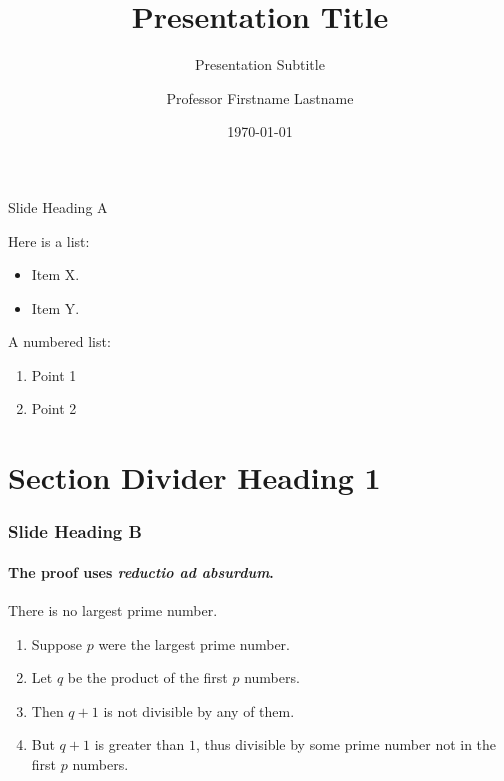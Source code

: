 \documentclass[handout]{beamer} 	%
\title{Presentation Title}
\subtitle{Presentation Subtitle} %
\author{Professor Firstname Lastname}
\institute{Faculty, Centre, or Unit}
\date{\today} %
\begin{document}
\begin{frame}
  \titlepage
\end{frame}


\begin{frame}{Slide Heading A}

Here is a list:
\begin{itemize}
\item Item X.
\item Item Y.
\end{itemize}

\bigskip

A numbered list:
\begin{enumerate}
\item Point 1
\item Point 2
\end{enumerate}

\end{frame}



\section{Section Divider Heading 1}
\begin{frame}
  \sectionpage
\end{frame}

\begin{frame} 
\frametitle{Slide Heading B} 
\framesubtitle{The proof uses \textit{reductio ad absurdum}.} 

\begin{theorem}
There is no largest prime number. \end{theorem} 
\begin{enumerate} 
\item<1-| alert@1> Suppose $p$ were the largest prime number. 
\item<2-> Let $q$ be the product of the first $p$ numbers. 
\item<3-> Then $q+1$ is not divisible by any of them. 
\item<1-> But $q + 1$ is greater than $1$, thus divisible by some prime
number not in the first $p$ numbers.
\end{enumerate}

\end{frame}
\end{document}
